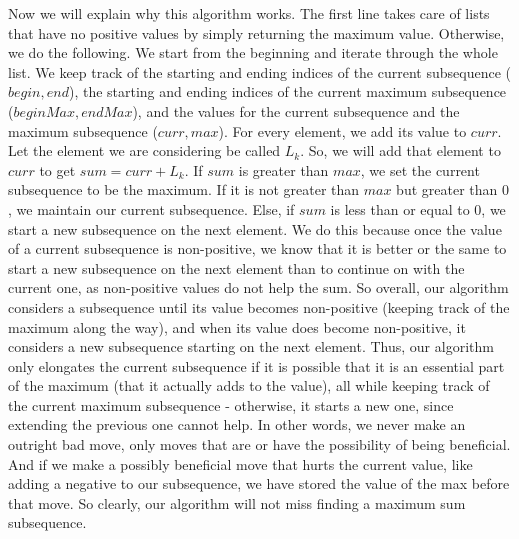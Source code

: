 \documentclass{article}
\begin{document}
Now we will explain why this algorithm works. The first line takes care of lists
that have no positive values by simply returning the maximum value. Otherwise,
we do the following. We start from the
beginning and iterate through the whole list. We keep track of the starting and
ending indices of the current subsequence ($begin,end$), the starting and ending
indices of the current maximum subsequence ($beginMax,endMax$), and the values
for the current subsequence and the maximum subsequence ($curr,max$). For every element, we add its
value to $curr$. Let the element we are considering be called $L_k$.
So, we will add that element to $curr$ to get $sum = curr + L_k$. If $sum$ is
greater than $max$, we set the current subsequence to be the maximum. If it is
not greater than $max$ but greater than $0$, we maintain our current
subsequence. Else, if $sum$ is less than or equal to $0$, we start a new
subsequence on the next element. We do this because once the value of a current
subsequence is non-positive, we know that it is better or the same to start a new
subsequence on the next element than to continue on with the current one, as
non-positive values do not help the sum. So overall, our algorithm considers
a subsequence until its value becomes non-positive (keeping track of the
maximum along the way), and when its value does become non-positive, it
considers a new subsequence starting on the next element. Thus, our algorithm
only elongates the current subsequence if it is possible that it is an essential
part of the maximum (that it actually adds to the value), all while keeping track of
the current maximum subsequence
- otherwise, it starts a new one, since extending the previous one cannot help.
In other words, we never make an outright bad move, only moves that are or have
the possibility of being beneficial. And if we make a possibly beneficial move
that hurts the current value, like adding a negative to our subsequence, we have
stored the value of the max before that move.
So clearly, our algorithm will not miss finding a maximum sum subsequence.
\newpage

\end{document}
